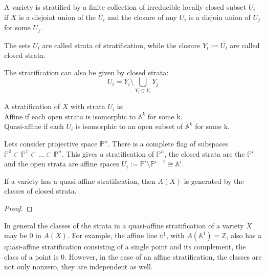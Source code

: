\documentclass[12pt]{article}
\begin{document}
\begin{df}
    A variety is stratified by a finite collection of irreducible locally closed subset $U_{i}$ if $X$ is a disjoint union of the $U_{i}$ and the closure of any $U_{i}$ is a disjoin union of $U_{j}$ for some $U_{j}$. 

    The sets $U_{i}$ are called strata of stratification, while the closure $Y_{i} := \overline{U_{i}}$ are called closed strata.

\end{df}
 
The stratification can also be given by closed strata:
 \[ U_{i} = Y_{i} \setminus \bigcup_{Y_{j}\subsetneq Y_{i}} Y_{j}\]

 \begin{df}
     A stratification of $X$ with strata $U_{i}$ is:\\
     Affine if each open strata is isomorphic to $\mathbb{A}^{k}$ for some k.\\
     Quasi-affine if each $U_{i}$ is isomorphic to an open subset of $\mathbb{A}^{k}$ for some k.

 \end{df}


\begin{eg}
   Lets consider projective space $\mathbb{P}^{n}$. There is a complete flag of subspaces $\mathbb{P}^{0}\subset \mathbb{P}^{1}\subset \dots \subset \mathbb{P}^{n}$. This gives a stratification of $\mathbb{P}^{n}$, the closed strata are the $\mathbb{P}^{i}$ and the open strata are affine spaces $U_{i}:= \mathbb{P}^{i}\setminus \mathbb{P}^{i-1} \cong \mathbb{A}^{i}$.
\end{eg}

\begin{prop}
    If a variety has a quasi-affine stratification, then $A(X)$ is generated by the classes of closed strata.
\end{prop}

\begin{proof}
    
\end{proof}

In general the classes of the strata in a quasi-affine stratification of a variety $X$ may be 0 in $A(X)$. For example, the affine line $\mathbb{a}^{1}$, with $A(\mathbb{A}^{1}) = \mathbb{Z}$, also has a quasi-affine stratification consisting of a single point and its complement, the class of a point is 0. However, in the case of an affine stratification, the classes are not only nonzero, they are independent as well.
\end{document}
